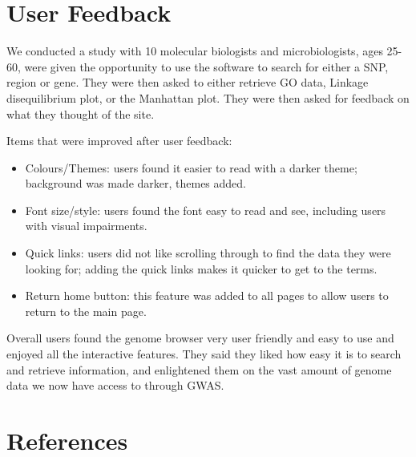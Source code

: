 \documentclass[12pt,a4paper]{article}
\newcommand{\sect}[1]{
\clearpage
\hypertarget{#1}{
\section{#1}\label{#1}}
}
\begin{document}
\begin{tcolorbox}[colback=gray!5!white,grow to left by=20mm,grow to right by=20mm,sharp corners]
{{    \small \inputminted[breaklines]{javascript}{code_snippets/themes/themes.js}		}}
\end{tcolorbox}




\sect{User Feedback}
We conducted a study with 10 molecular biologists and microbiologists, ages 25-60, were given the opportunity to use the software to search for either a SNP, region or gene. They were then asked to either retrieve GO data, Linkage disequilibrium plot, or the Manhattan plot. They were then asked for feedback on what they thought of the site.

Items that were improved after user feedback:

\begin{itemize}
\item Colours/Themes: users found it easier to read with a darker theme; background was made darker, themes added.
\item Font size/style: users found the font easy to read and see, including users with visual impairments.
\item Quick links: users did not like scrolling through to find the data they were looking for; adding the quick links makes it quicker to get to the terms.
\item Return home button: this feature was added to all pages to allow users to return to the main page.
\end{itemize}

Overall users found the genome browser very user friendly and easy to use and enjoyed all the interactive features. They said they liked how easy it is to search and retrieve information, and enlightened them on the vast amount of genome data we now have access to through GWAS.

\sect{References}
\printbibliography[heading=none]
\end{document}
